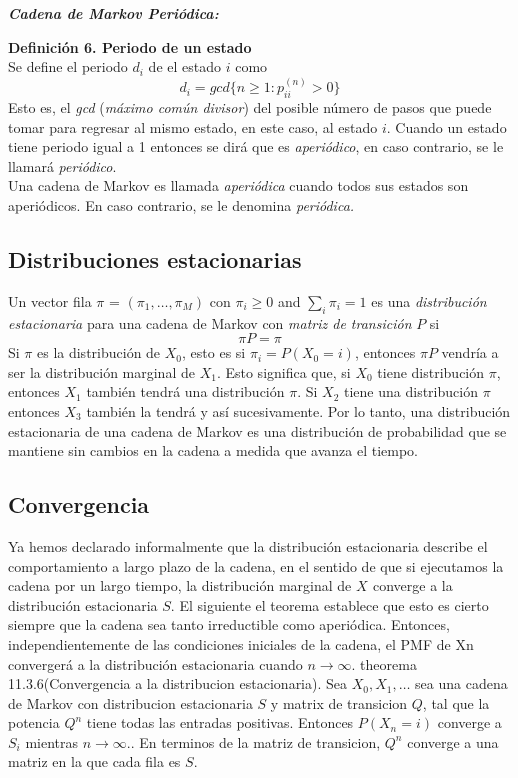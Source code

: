 \documentclass[10pt,a4paper]{article}
\theoremstyle{definition}
\theoremstyle{remark}
\begin{document}
\begin{multicols}{2}
\textbf{\textit{Cadena de Markov Periódica:}}
\vspace*{0.25cm}

\textbf{Definición 6. Periodo de un estado}\\
Se define el periodo $d_{i}$ de el estado $i$ como
\[
d_{i} = gcd\{n\geq1:p_{ii}^{(n)}>0\}
\]
Esto es, el \textit{gcd} (\textit{máximo común divisor}) del posible número de pasos que puede tomar para regresar al mismo estado, en este caso, al estado $i$. 
Cuando un estado tiene periodo igual a 1 entonces se dirá que es \textit{aperiódico}, en caso contrario, se le llamará \textit{periódico}.\\
Una cadena de Markov es llamada \textit{aperiódica} cuando todos sus estados son aperiódicos. En caso contrario, se le denomina \textit{periódica.}

\subsection{Distribuciones estacionarias}
\noindent Un vector fila $\pi$ = $(\pi_{1},\dots,\pi_{M})$ con $\pi_{i}\geq0$ and $\sum_{i}\pi_{i} = 1$ es una \textit{distribución estacionaria} para una cadena de Markov con \textit{matriz de transición} $P$ si
\[
\pi P = \pi
\]
Si $\pi$ es la distribución de $X_{0}$, esto es si $\pi_{i} = P(X_{0} = i)$, entonces $\pi P$ vendría a ser la distribución marginal de $X_{1}$. Esto significa que, si $X_{0}$ tiene distribución $\pi$, entonces $X_{1}$ también tendrá una distribución $\pi$. Si $X_{2}$ tiene una distribución $\pi$ entonces $X_{3}$ también la tendrá y así sucesivamente.
Por lo tanto, una distribución estacionaria de una cadena de Markov es una distribución de probabilidad que se mantiene sin cambios en la cadena a medida que avanza el tiempo.


\subsection{Convergencia}
Ya hemos declarado informalmente que la distribución estacionaria describe el
comportamiento a largo plazo de la cadena, en el sentido de que si ejecutamos la cadena por un largo tiempo,
la distribución marginal de $X_{}$ converge a la distribución estacionaria $S$. El siguiente
el teorema establece que esto es cierto siempre que la cadena sea tanto irreductible como aperiódica.
Entonces, independientemente de las condiciones iniciales de la cadena, el PMF de Xn convergerá a la distribución estacionaria cuando  $n \longrightarrow \infty.$ 
theorema 11.3.6(Convergencia a la distribucion estacionaria). Sea $X_0,X_1,\dots $ sea una cadena de Markov con distribucion estacionaria $S$ y matrix de transicion $Q$, tal que la potencia $Q^{n}$ tiene todas las entradas positivas. Entonces $P(X_{n}=i)$ converge a $S_{i}$ mientras  $n \longrightarrow \infty.$. En terminos de la matriz de transicion, $Q^{n}$ converge a una matriz en la que cada fila es $S$.\\



\end{multicols}
\end{document}
